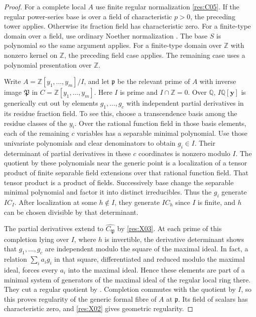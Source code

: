\begin{proof}
For a complete local \(A\) use finite regular normalization \ref{res:C05}. If the regular power-series base is over a field of characteristic \(p>0\), the preceding tower applies. Otherwise its fraction field has characteristic zero. For a finite-type domain over a field, use ordinary Noether normalization \cite[ALG-05-C03-R02]{p103}. The base \(S\) is polynomial so the same argument applies. For a finite-type domain over \(\mathbb Z\) with nonzero kernel on \(\mathbb Z\), the preceding field case applies. The remaining case uses a polynomial presentation over \(\mathbb Z\).

Write \(A=\mathbb Z[y_1,\ldots,y_m]/I\), and let \(\mathfrak p\) be the relevant prime of \(A\) with inverse image \(\mathfrak P\) in \(C=\mathbb Z[y_1,\ldots,y_m]\). Here \(I\) is prime and \(I\cap\mathbb Z=0\). Over \(\mathbb Q\), \(I\mathbb Q[\mathbf y]\) is generically cut out by elements \(g_1,\ldots,g_c\) with independent partial derivatives in its residue fraction field. To see this, choose a transcendence basis among the residue classes of the \(y_i\). Over the rational function field in those basis elements, each of the remaining \(c\) variables has a separable minimal polynomial. Use those univariate polynomials and clear denominators to obtain \(g_i\in I\). Their determinant of partial derivatives in these \(c\) coordinates is nonzero modulo \(I\). The quotient by these polynomials near the generic point is a localization of a tensor product of finite separable field extensions over that rational function field. That tensor product is a product of fields. Successively base change the separable minimal polynomial and factor it into distinct irreducibles. Thus the \(g_i\) generate \(IC_I\). After localization at some \(h\notin I\), they generate \(I C_h\) since \(I\) is finite, and \(h\) can be chosen divisible by that determinant.

The partial derivatives extend to \(\widehat{C_{\mathfrak P}}\) by \ref{res:X03}. At each prime of this completion lying over \(I\), where \(h\) is invertible, the derivative determinant shows that \(g_1,\ldots,g_c\) are independent modulo the square of the maximal ideal. In fact, a relation \(\sum_i a_i g_i\) in that square, differentiated and reduced modulo the maximal ideal, forces every \(a_i\) into the maximal ideal. Hence these elements are part of a minimal system of generators of the maximal ideal of the regular local ring there. They cut a regular quotient by \cite[CM-08]{core}. Completion commutes with the quotient by \(I\), so this proves regularity of the generic formal fibre of \(A\) at \(\mathfrak p\). Its field of scalars has characteristic zero, and \ref{res:X02} gives geometric regularity.
\end{proof}

